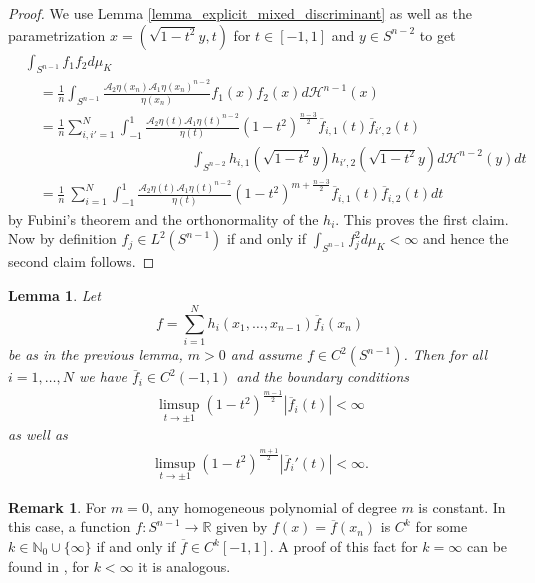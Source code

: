 \documentclass[12pt,twoside]{amsart}
\numberwithin{satz}{section}
\newtheorem{lemma}[satz]{Lemma}
\theoremstyle{definition}
\newtheorem{remark}[satz]{Remark}
\numberwithin{equation}{section}
\newcommand\R{\mathbb{R}}
\newcommand\N{\mathbb{N}}
\begin{document}
	\begin{proof}
		We use Lemma \ref{lemma_explicit_mixed_discriminant} as well as the parametrization $x=(\sqrt{1-t^2}y,t)$ for $t\in[-1,1]$ and $y\in S^{n-2}$ to get
		\begin{align*}
			&\int_{S^{n-1}} f_1f_2 d\mu_K \\
			& \quad =\frac{1}{n}\int_{S^{n-1}} \frac{\mathcal{A}_2\eta(x_n)\mathcal{A}_1\eta(x_n)^{n-2}}{\eta(x_n)}f_1(x)f_2(x)d\mathcal{H}^{n-1}(x) \\
			& \quad = \frac{1}{n}\sum_{i,i'=1}^N\int_{-1}^1 \frac{\mathcal{A}_2\eta(t)\mathcal{A}_1\eta(t)^{n-2}}{\eta(t)}(1-t^2)^{\frac{n-3}{2}}\overline{f}_{i,1}(t)\overline{f}_{i',2}(t) \\
			& \hspace{5cm} \int_{S^{n-2}} h_{i,1}(\sqrt{1-t^2}y)h_{i',2}(\sqrt{1-t^2}y) d\mathcal{H}^{n-2}(y) dt \\
			& \quad  =\frac{1}{n} \ \sum_{i=1}^N\int_{-1}^1 \frac{\mathcal{A}_2\eta(t)\mathcal{A}_1\eta(t)^{n-2}}{\eta(t)}(1-t^2)^{m+\frac{n-3}{2}} \overline{f}_{i,1}(t)\overline{f}_{i,2}(t)dt
		\end{align*}
		by Fubini's theorem and the orthonormality of the $h_i$. This proves the first claim. Now by definition $f_j\in L^2 (S^{n-1})$ if and only if $\int_{S^{n-1}}f_j^2d\mu_K<\infty$ and hence the second claim follows.
	\end{proof}
	
	\begin{lemma}\label{lemma_Cinfty}
		Let $$f=\sum_{i=1}^N h_{i}(x_1,\dots,x_{n-1})\overline{f}_{i}(x_n)$$ be as in the previous lemma, $m>0$ and assume $f\in C^2(S^{n-1})$. Then for all $i=1,\dots,N$ we have $\overline{f}_i\in C^2(-1,1)$ and the boundary conditions 
		\begin{align}\label{dirichlet_boundary_conditions}
			\limsup\limits_{t\to\pm 1} (1-t^2)^{\frac{m-1}{2}}\left|\overline{f}_i(t)\right|<\infty
		\end{align}
		as well as
		\begin{align}\label{neumann_boundary_conditions}
			\limsup\limits_{t\to\pm 1} (1-t^2)^{\frac{m+1}{2}}\left|\overline{f}_i'(t)\right|<\infty.
		\end{align}
	\end{lemma}
	
	\begin{remark}\label{remark_Cinfty}
		For $m=0$, any homogeneous polynomial of degree $m$ is constant. In this case, a function $f:S^{n-1}\to \R$ given by $f(x)=\overline{f}(x_n)$ is $C^k$ for some $k\in\N_0\cup\{\infty\}$ if and only if $\overline{f}\in C^k[-1,1]$. A proof of this fact for $k=\infty$ can be found in \cite[Theorem 2.17]{braunerhofstaetterortegamoreno}, for $k<\infty$ it is analogous.
	\end{remark}
	
\end{document}
